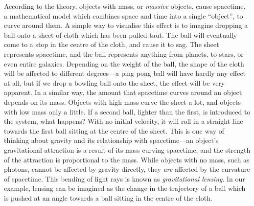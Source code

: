 \documentclass[a4paper,11pt,twoside]{article}
\begin{document}
   According to the theory, objects with mass, or \emph{massive} objects, cause
   spacetime, a mathematical model which combines space and time into a single
   ``object'', to curve around them. A simple way to visualise this effect is to
   imagine dropping a ball onto a sheet of cloth which has been pulled taut. The
   ball will eventually come to a stop in the centre of the cloth, and cause it
   to sag. The sheet represents spacetime, and the ball represents anything from
   planets, to stars, or even entire galaxies. Depending on the weight of the
   ball, the shape of the cloth will be affected to different degrees---a ping
   pong ball will have hardly any effect at all, but if we drop a bowling ball
   onto the sheet, the effect will be very apparent. In a similar way, the
   amount that spacetime curves around an object depends on its mass. Objects
   with high mass curve the sheet a lot, and objects with low mass only a
   little. If a second ball, lighter than the first, is introduced to the
   system, what happens?  With no initial velocity, it will roll in a straight
   line towards the first ball sitting at the centre of the sheet. This is one
   way of thinking about gravity and its relationship with spacetime---an
   object's gravitational attraction is a result of its mass curving spacetime,
   and the strength of the attraction is proportional to the mass. While objects
   with no mass, such as photons, cannot be affected by gravity directly, they
   \emph{are} affected by the curvature of spacetime. This bending of light rays
   is known as \emph{gravitational lensing}. In our example, lensing can be
   imagined as the change in the trajectory of a ball which is pushed at an
   angle towards a ball sitting in the centre of the cloth.
\end{document}
